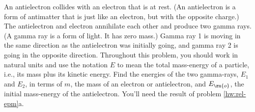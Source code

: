 An antielectron collides with an electron that is at
rest. (An antielectron is a form of antimatter that is just
like an electron, but with the opposite charge.) The
antielectron and electron annihilate each other and produce
two gamma rays. (A gamma ray is a form of light. It has zero
mass.) Gamma ray 1 is moving in the same direction as the
antielectron was initially going, and gamma ray 2 is going
in the opposite direction. Throughout this problem, you
should work in natural units and use the notation $E$ to mean
the total mass-energy of a particle, i.e., its mass plus its
kinetic energy. Find the energies of the two gamma-rays, $E_1$
and $E_2$, in terms of $m$, the mass of an electron or
antielectron, and $E_\zu{o}$, the initial mass-energy of the
antielectron. You'll need the result of problem \ref{hw:rel-epm}a.

